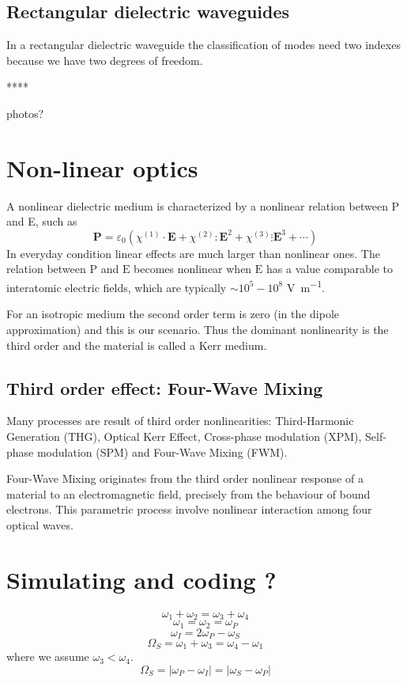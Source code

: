 \documentclass[12pt,a4paper,twocolumn,twoside]{article}
\begin{document}
\subsection{Rectangular dielectric waveguides}
In a rectangular dielectric waveguide the classification of modes need two indexes because we have two degrees of freedom.

****

photos?
\section{Non-linear optics}
A nonlinear dielectric medium is characterized by a nonlinear relation between P and E, such as
$$\textbf{P} = \varepsilon_0 \left( \chi^{(1)} \cdot \textbf{E} + \chi^{(2)} : \textbf{E}^2 + \chi^{(3)} \vdots \textbf{E}^3 + \cdots \right) $$
In everyday condition linear effects are much larger than nonlinear ones.
The relation between $\mathrm{P}$ and $\mathrm{E}$ becomes nonlinear when $\mathrm{E}$ has a value comparable to interatomic electric fields, which are typically $\sim 10^5-10^8$ \si{\V\per\m}.

For an isotropic medium the second order term is zero (in the dipole approximation) and this is our scenario.
Thus the dominant nonlinearity is the third order and the material is called a Kerr medium.
\subsection{Third order effect: Four-Wave Mixing}
Many processes are result of third order nonlinearities: Third-Harmonic Generation (THG), Optical Kerr Effect, Cross-phase modulation (XPM), Self-phase modulation (SPM) and Four-Wave Mixing (FWM).

Four-Wave Mixing originates from the third order nonlinear response of a material to an electromagnetic field, precisely from the behaviour of bound electrons.
This parametric process involve nonlinear interaction among four optical waves.
\section{Simulating and coding ?}

$$\omega_1 + \omega_2 = \omega_3 + \omega_4$$
$$\omega_1 = \omega_2 = \omega_P$$
$$\omega_I = 2\omega_P - \omega_S$$
$$\Omega_S = \omega_1 + \omega_3 = \omega_4 - \omega_1$$
where we assume $\omega_3 < \omega_4$.
$$\Omega_S = |\omega_P - \omega_I| = |\omega_S - \omega_P|$$
\end{document}
